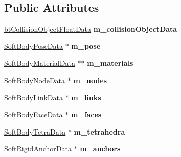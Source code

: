 \subsection*{Public Attributes}
\begin{DoxyCompactItemize}
\item 
\mbox{\label{structbtSoftBodyFloatData_a7bf640f8ab4727d5c0afdd931ec394bf}} 
\hyperlink{structbtCollisionObjectFloatData}{bt\+Collision\+Object\+Float\+Data} {\bfseries m\+\_\+collision\+Object\+Data}
\item 
\mbox{\label{structbtSoftBodyFloatData_a896ecc30699126c6cfdcbf7e5c785b85}} 
\hyperlink{structSoftBodyPoseData}{Soft\+Body\+Pose\+Data} $\ast$ {\bfseries m\+\_\+pose}
\item 
\mbox{\label{structbtSoftBodyFloatData_a1c2eb2cfbd47268c99356da697493119}} 
\hyperlink{structSoftBodyMaterialData}{Soft\+Body\+Material\+Data} $\ast$$\ast$ {\bfseries m\+\_\+materials}
\item 
\mbox{\label{structbtSoftBodyFloatData_ab4bd212580ff9b134ab620dbc01fbb1c}} 
\hyperlink{structSoftBodyNodeData}{Soft\+Body\+Node\+Data} $\ast$ {\bfseries m\+\_\+nodes}
\item 
\mbox{\label{structbtSoftBodyFloatData_acde7e936618e016b807fa4f83a5ba9bc}} 
\hyperlink{structSoftBodyLinkData}{Soft\+Body\+Link\+Data} $\ast$ {\bfseries m\+\_\+links}
\item 
\mbox{\label{structbtSoftBodyFloatData_a8a1ce3fd7729efe1b6cb444e51f24c80}} 
\hyperlink{structSoftBodyFaceData}{Soft\+Body\+Face\+Data} $\ast$ {\bfseries m\+\_\+faces}
\item 
\mbox{\label{structbtSoftBodyFloatData_a4302a6fddf55d898638c448a5b2410d7}} 
\hyperlink{structSoftBodyTetraData}{Soft\+Body\+Tetra\+Data} $\ast$ {\bfseries m\+\_\+tetrahedra}
\item 
\mbox{\label{structbtSoftBodyFloatData_affe0e40c3328c40efe8185f985c88333}} 
\hyperlink{structSoftRigidAnchorData}{Soft\+Rigid\+Anchor\+Data} $\ast$ {\bfseries m\+\_\+anchors}
$$
\end{DoxyCompactItemize}
